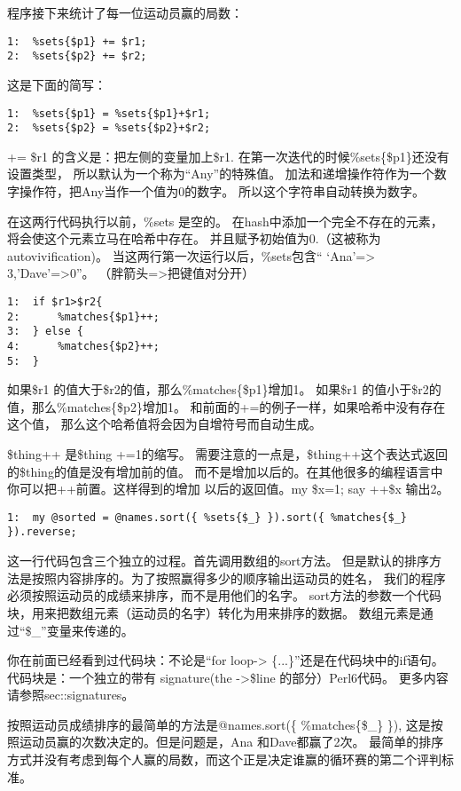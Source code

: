 \documentclass[11pt]{ctexart}
\begin{document}
程序接下来统计了每一位运动员赢的局数：

\begin{verbatim}
1:  %sets{$p1} += $r1;
2:  %sets{$p2} += $r2;
\end{verbatim}
这是下面的简写：

\begin{verbatim}
1:  %sets{$p1} = %sets{$p1}+$r1;
2:  %sets{$p2} = %sets{$p2}+$r2;
\end{verbatim}
+= \$r1 的含义是：把左侧的变量加上\$r1.
在第一次迭代的时候\%sets\{\$p1\}还没有设置类型，
所以默认为一个称为“Any”的特殊值。
加法和递增操作符作为一个数字操作符，把Any当作一个值为0的数字。
所以这个字符串自动转换为数字。

在这两行代码执行以前，\%sets 是空的。
在hash中添加一个完全不存在的元素，将会使这个元素立马在哈希中存在。
并且赋予初始值为0.（这被称为autovivification)。
当这两行第一次运行以后，\%sets包含“ `Ana'=> 3,'Dave'=>0”。
（胖箭头=>把键值对分开）


\begin{verbatim}
1:  if $r1>$r2{
2:      %matches{$p1}++;
3:  } else {
4:      %matches{$p2}++;
5:  }
\end{verbatim}
如果\$r1 的值大于\$r2的值，那么\%matches\{\$p1\}增加1。
如果\$r1 的值小于\$r2的值，那么\%matches\{\$p2\}增加1。
和前面的+=的例子一样，如果哈希中没有存在这个值，
那么这个哈希值将会因为自增符号而自动生成。

\$thing++ 是\$thing +=1的缩写。
需要注意的一点是，\$thing++这个表达式返回的\$thing的值是没有增加前的值。
而不是增加以后的。在其他很多的编程语言中你可以把++前置。这样得到的增加
以后的返回值。my \$x=1; say ++\$x 输出2。


\begin{verbatim}
1:  my @sorted = @names.sort({ %sets{$_} }).sort({ %matches{$_} }).reverse;
\end{verbatim}

这一行代码包含三个独立的过程。首先调用数组的sort方法。
但是默认的排序方法是按照内容排序的。为了按照赢得多少的顺序输出运动员的姓名，
我们的程序必须按照运动员的成绩来排序，而不是用他们的名字。
sort方法的参数一个代码块，用来把数组元素（运动员的名字）转化为用来排序的数据。
数组元素是通过“\$\_”变量来传递的。

你在前面已经看到过代码块：不论是“for loop-> \{...\}”还是在代码块中的if语句。
代码块是：一个独立的带有 signature(the ->\$line 的部分）Perl6代码。
更多内容请参照sec::signatures。

按照运动员成绩排序的最简单的方法是@names.sort(\{ \%matches\{\$\_\} \}),
这是按照运动员赢的次数决定的。但是问题是，Ana 和Dave都赢了2次。
最简单的排序方式并没有考虑到每个人赢的局数，而这个正是决定谁赢的循环赛的第二个评判标准。
\end{document}
